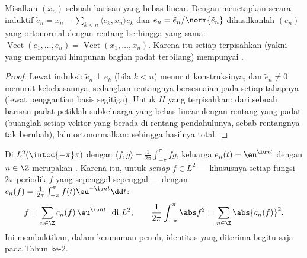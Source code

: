 \begin{proposition}\label{prop:b3:hilbert:gramschmidt}
Misalkan $(x_n)$ sebuah barisan yang bebas linear. Dengan menetapkan
secara induktif $\tilde e_n = x_n - \sum_{k<n}\langle e_k,
x_n\rangle e_k$ dan $e_n = \tilde e_n/\norm{\tilde e_n}$
dihasilkanlah $(e_n)$ yang ortonormal dengan rentang berhingga yang sama:
$\operatorname{Vect}(e_1, \dots, e_n) = \operatorname{Vect}
(x_1, \dots, x_n)$. Karena itu setiap  terpisahkan
(yakni yang mempunyai himpunan bagian padat terbilang) mempunyai .
\end{proposition}

\begin{proof}
Lewat induksi: $\tilde e_n \perp e_k$ (bila $k < n$) menurut konstruksinya,
dan $\tilde e_n \neq 0$ menurut kebebasannya; sedangkan rentangnya bersesuaian pada
setiap tahapnya (lewat penggantian basis segitiga). Untuk $H$ yang terpisahkan:
dari sebuah barisan padat petiklah subkeluarga yang bebas
linear dengan rentang yang padat (buanglah setiap vektor yang berada di rentang
pendahulunya, sebab rentangnya tak berubah), lalu ortonormalkan:
sehingga hasilnya total.
\end{proof}

\begin{theorem}
\label{thm:b3:hilbert:fourier}
Di $L^2(\intcc{-\pi}\pi)$ dengan $\langle f, g\rangle =
\frac1{2\pi}\int_{-\pi}^\pi \bar fg$, keluarga $e_n(t) =
\eu^{\iu nt}$ dengan $n \in \Z$ merupakan . Karena itu,
untuk \emph{setiap} $f \in L^2$ --- khususnya setiap fungsi
$2\pi$-periodik $f$ yang  sepenggal-sepenggal --- dengan $c_n(f) =
\frac1{2\pi}\int_{-\pi}^{\pi}f(t)\eu^{-\iu nt}\dd t$:
\[
f = \sum_{n\in\Z}c_n(f)\,\eu^{\iu nt} \ \ \text{di } L^2,
\qquad
\frac1{2\pi}\int_{-\pi}^{\pi}\abs f^2 =
\sum_{n\in\Z}\abs{c_n(f)}^2 .
\]
Ini membuktikan, dalam keumuman penuh, identitas  yang
diterima begitu saja pada Tahun ke-2.
\end{theorem}


